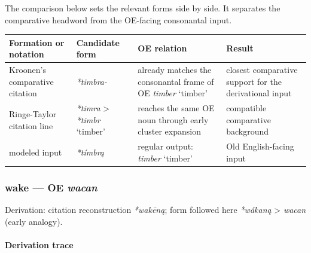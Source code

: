 \documentclass[
  british,
  a4paper,
]{article}
\newcounter{none} %
\providecommand{\Recon}[1]{\emph{*#1}}
\begin{document}
The comparison below sets the relevant forms side by side. It separates
the comparative headword from the OE-facing consonantal input.

{\def\LTcaptype{none} %
\begin{longtable}[]{@{}
  >{\raggedright\arraybackslash}p{}
  >{\raggedright\arraybackslash}p{}
  >{\raggedright\arraybackslash}p{}
  >{\raggedright\arraybackslash}p{}@{}}
\toprule\noalign{}
\begin{minipage}[b]{\linewidth}\raggedright
Formation or notation
\end{minipage} & \begin{minipage}[b]{\linewidth}\raggedright
Candidate form
\end{minipage} & \begin{minipage}[b]{\linewidth}\raggedright
OE relation
\end{minipage} & \begin{minipage}[b]{\linewidth}\raggedright
Result
\end{minipage} \\
\midrule\noalign{}
\endhead
\bottomrule\noalign{}
\endlastfoot
Kroonen's comparative citation & {\emph{*timbra-}} & already matches the
consonantal frame of OE {\emph{timber}} `timber' & closest comparative
support for the derivational input \\
Ringe-Taylor citation line & {\emph{*timra}} \textgreater{}
\Recon{timbr} `timber' & reaches the same OE noun through early cluster
expansion & compatible comparative background \\
modeled input & {\emph{*tímbrą}} & regular output: {\emph{timber}}
`timber' & Old English-facing input \\
\end{longtable}
}

\subsubsection{\texorpdfstring{wake --- OE
\emph{wacan}}{wake --- OE wacan}}\label{wake-oe-wacan}

Derivation: citation reconstruction \emph{*wakēną}; form followed here
\emph{*wákaną} \textgreater{} \emph{wacan} (early analogy).

\paragraph{Derivation trace}\label{derivation-trace-140}
\end{document}
